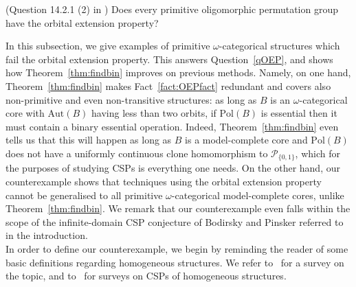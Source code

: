 \documentclass{article}
\theoremstyle{remark}
\theoremstyle{definition}
\newenvironment{customq}[1]
  {\renewcommand\theinnercustomq{#1}\innercustomq}
  {\endinnercustomq}
\begin{document}
\begin{customq}{\ref{qOEP}}(Question 14.2.1 (2) in {\cite{BodCSP}})
   Does every primitive oligomorphic permutation group have the orbital extension property?
\end{customq}


In this subsection, we give examples of  primitive $\omega$-categorical structures which fail the orbital extension property. This answers Question~\ref{qOEP}, and shows how Theorem~\ref{thm:findbin} improves on previous methods.  Namely, on one hand,  Theorem~\ref{thm:findbin} makes  Fact~\ref{fact:OEPfact} redundant and covers also non-primitive and even non-transitive structures:  as long as $B$ is an $\omega$-categorical core with $\mathrm{Aut}(B)$ having less than two orbits, if $\mathrm{Pol}(B)$ is essential then it must contain a binary essential operation. Indeed, Theorem~\ref{thm:findbin} even tells us that this will happen as long as $B$ is a model-complete core and $\mathrm{Pol}(B)$ does not have a uniformly continuous clone homomorphism to $\mathcal{P}_{\{0,1\}}$, which for the purposes of studying CSPs is everything one needs. On the other hand, our counterexample shows  that techniques using the orbital extension property cannot be generalised to all primitive $\omega$-categorical model-complete cores, unlike Theorem~\ref{thm:findbin}. We remark that our counterexample even falls within the scope of the infinite-domain CSP conjecture of Bodirsky and Pinsker referred to in the introduction.\\


In order to define our counterexample, we begin by reminding the reader of some basic definitions regarding homogeneous structures. We refer to~\cite{homogeneous} for a survey on the topic, and to~\cite{BodCSP, infinitesheep} for surveys on CSPs of homogeneous structures. 
\end{document}
